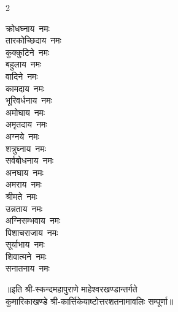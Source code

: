 \begin{multicols}{2}
\begin{flushleft}
क्रोधघ्नाय~नमः\\
तारकोच्छिदाय~नमः\\
कुक्कुटिने~नमः\hfill{}\\
बहुलाय~नमः\\
वादिने~नमः\\
कामदाय~नमः\\
भूरिवर्धनाय~नमः\\
अमोघाय~नमः\\
अमृतदाय~नमः\\
अग्नये~नमः\\
शत्रुघ्नाय~नमः\\
सर्वबोधनाय~नमः\\
अनघाय~नमः\hfill{}\\
अमराय~नमः\\
श्रीमते~नमः\\
उन्नताय~नमः\\
अग्निसम्भवाय~नमः\\
पिशाचराजाय~नमः\\
सूर्याभाय~नमः\\
शिवात्मने~नमः\\
सनातनाय~नमः\hfill{}\\
\end{flushleft}
\end{multicols}
॥इति श्री-स्कन्दमहापुराणे माहेश्वरखण्डान्तर्गते\\कुमारिकाखण्डे श्री-कार्त्तिकेयाष्टोत्तरशतनामावलिः सम्पूर्णा॥
